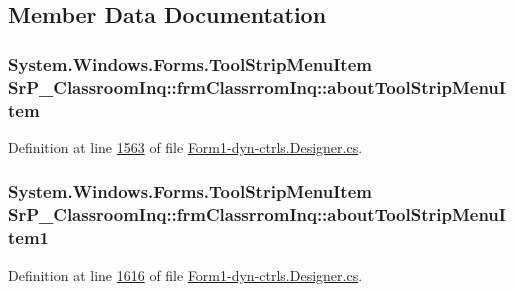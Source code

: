 \subsection{\-Member \-Data \-Documentation}
\hypertarget{class_sr_p___classroom_inq_1_1frm_classrrom_inq_a91d70ebcd0a0ce1237f845c90919cc8b}{
\subsubsection[{about\-Tool\-Strip\-Menu\-Item}]{\setlength{\rightskip}{0pt plus 5cm}\-System.\-Windows.\-Forms.\-Tool\-Strip\-Menu\-Item {\bf \-Sr\-P\-\_\-\-Classroom\-Inq\-::frm\-Classrrom\-Inq\-::about\-Tool\-Strip\-Menu\-Item}}}
\label{class_sr_p___classroom_inq_1_1frm_classrrom_inq_a91d70ebcd0a0ce1237f845c90919cc8b}


\-Definition at line \hyperlink{_form1-dyn-ctrls_8_designer_8cs_source_l01563}{1563} of file \hyperlink{_form1-dyn-ctrls_8_designer_8cs_source}{\-Form1-\/dyn-\/ctrls.\-Designer.\-cs}.

\hypertarget{class_sr_p___classroom_inq_1_1frm_classrrom_inq_ab34838f16ac4c613949fc6e6b18e972d}{
\subsubsection[{about\-Tool\-Strip\-Menu\-Item1}]{\setlength{\rightskip}{0pt plus 5cm}\-System.\-Windows.\-Forms.\-Tool\-Strip\-Menu\-Item {\bf \-Sr\-P\-\_\-\-Classroom\-Inq\-::frm\-Classrrom\-Inq\-::about\-Tool\-Strip\-Menu\-Item1}}}
\label{class_sr_p___classroom_inq_1_1frm_classrrom_inq_ab34838f16ac4c613949fc6e6b18e972d}


\-Definition at line \hyperlink{_form1-dyn-ctrls_8_designer_8cs_source_l01616}{1616} of file \hyperlink{_form1-dyn-ctrls_8_designer_8cs_source}{\-Form1-\/dyn-\/ctrls.\-Designer.\-cs}.


